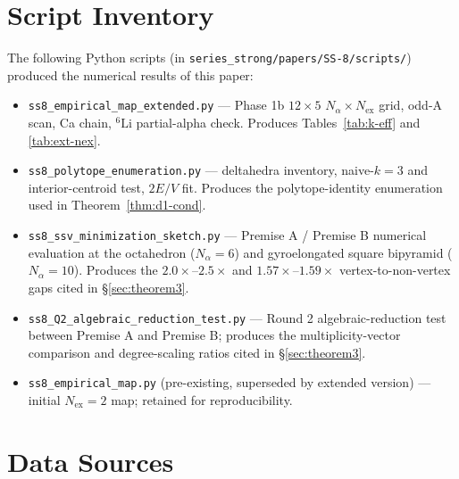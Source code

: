 \documentclass[11pt,letterpaper]{article}
\theoremstyle{definition}
\newcommand{\Nalpha}{N_\alpha}
\newcommand{\Nex}{N_{\text{ex}}}
\begin{document}





\appendix

\section{Script Inventory}
\label{app:scripts}

The following Python scripts (in \texttt{series\_strong/papers/SS-8/scripts/}) produced the numerical results of this paper:

\begin{itemize}
  \item \texttt{ss8\_empirical\_map\_extended.py} --- Phase 1b $12 \times 5$ $\Nalpha \times \Nex$ grid, odd-A scan, Ca chain, ${}^{6}\mathrm{Li}$ partial-alpha check. Produces Tables~\ref{tab:k-eff} and \ref{tab:ext-nex}.
  \item \texttt{ss8\_polytope\_enumeration.py} --- deltahedra inventory, naive-$k=3$ and interior-centroid test, $2E/V$ fit. Produces the polytope-identity enumeration used in Theorem~\ref{thm:d1-cond}.
  \item \texttt{ss8\_ssv\_minimization\_sketch.py} --- Premise A / Premise B numerical evaluation at the octahedron ($\Nalpha = 6$) and gyroelongated square bipyramid ($\Nalpha = 10$). Produces the $2.0\times$--$2.5\times$ and $1.57\times$--$1.59\times$ vertex-to-non-vertex gaps cited in \S\ref{sec:theorem3}.
  \item \texttt{ss8\_Q2\_algebraic\_reduction\_test.py} --- Round 2 algebraic-reduction test between Premise A and Premise B; produces the multiplicity-vector comparison and degree-scaling ratios cited in \S\ref{sec:theorem3}.
  \item \texttt{ss8\_empirical\_map.py} (pre-existing, superseded by extended version) --- initial $\Nex = 2$ map; retained for reproducibility.
\end{itemize}

\section{Data Sources}
\label{app:data}
\end{document}
